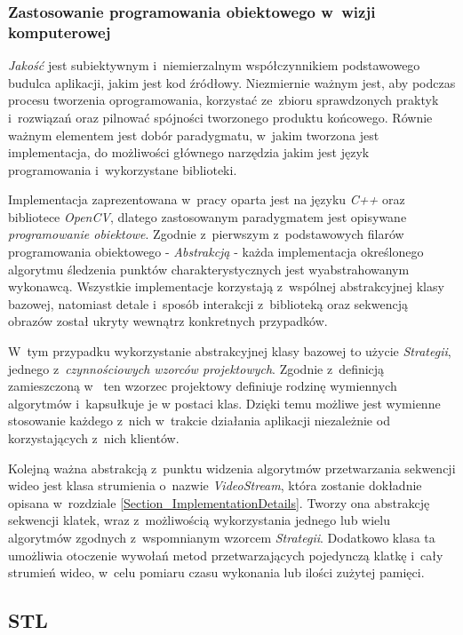       \subsubsection{Zastosowanie programowania obiektowego w~wizji komputerowej}
      \textit{Jakość} jest subiektywnym i~niemierzalnym współczynnikiem podstawowego budulca aplikacji, jakim jest kod źródłowy. Niezmiernie ważnym jest, aby podczas procesu tworzenia oprogramowania, korzystać ze~zbioru sprawdzonych praktyk i~rozwiązań oraz pilnować spójności tworzonego produktu końcowego. Równie ważnym elementem jest dobór paradygmatu, w~jakim tworzona jest implementacja, do możliwości głównego narzędzia jakim jest język programowania i~wykorzystane biblioteki.

      Implementacja zaprezentowana w~pracy oparta jest na języku \textit{C++} oraz bibliotece \textit{OpenCV}, dlatego zastosowanym paradygmatem jest opisywane \textit{programowanie obiektowe}. Zgodnie z~pierwszym z~podstawowych filarów programowania obiektowego - \textit{Abstrakcją} - każda implementacja określonego algorytmu śledzenia punktów charakterystycznych jest wyabstrahowanym wykonawcą. Wszystkie implementacje korzystają z~wspólnej abstrakcyjnej klasy bazowej, natomiast detale i~sposób interakcji z~biblioteką oraz sekwencją obrazów został ukryty wewnątrz konkretnych przypadków.

      W~tym przypadku wykorzystanie abstrakcyjnej klasy bazowej to użycie \textit{Strategii}, jednego z~\textit{czynnościowych wzorców projektowych}. Zgodnie z~definicją zamieszczoną w~\cite{PatternsGoF} ten wzorzec projektowy definiuje rodzinę wymiennych algorytmów i~kapsułkuje je w postaci klas. Dzięki temu możliwe jest wymienne stosowanie każdego z~nich w~trakcie działania aplikacji niezależnie od korzystających z~nich klientów.

      Kolejną ważna abstrakcją z~punktu widzenia algorytmów przetwarzania sekwencji wideo jest klasa strumienia o~nazwie \textit{VideoStream}, która zostanie dokładnie opisana w~rozdziale \ref{Section_ImplementationDetails}. Tworzy ona abstrakcję sekwencji klatek, wraz z~możliwością wykorzystania jednego lub wielu algorytmów zgodnych z~wspomnianym wzorcem \textit{Strategii}. Dodatkowo klasa ta umożliwia otoczenie wywołań metod przetwarzających pojedynczą klatkę i~cały strumień wideo, w~celu pomiaru czasu wykonania lub ilości zużytej pamięci.

    \subsection{STL}\label{Subsection_STL}


